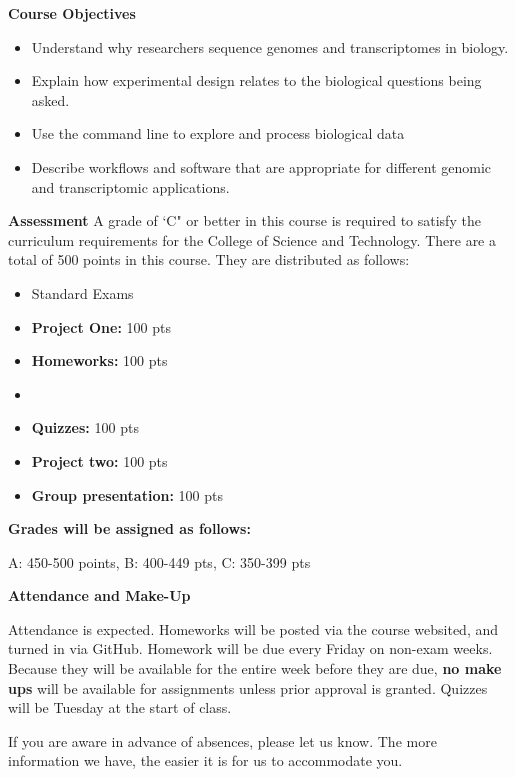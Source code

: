 \documentclass[12pt]{article}
\let\oldtextbf\textbf
\renewcommand{\textbf}[1]{\textcolor{coolblack}{\oldtextbf{#1}}}
\begin{document}
\bigskip
\begin{flushleft}

\textbf{Course Objectives}

\begin{itemize}

\item Understand why researchers sequence genomes and transcriptomes in biology.
\item Explain how experimental design relates to the biological questions being asked.
\item Use the command line to explore and process biological data
\item Describe workflows and software that are appropriate for different genomic and transcriptomic applications.

\end{itemize}
\end{flushleft}

\bigskip

\begin{flushleft}
\textbf{Assessment}
A grade of `C" or better in this course is required to satisfy the curriculum requirements for the College of Science and Technology. There are a total of 500 points in this course. They are distributed as follows:

\begin{itemize}
\item Standard Exams
\item \textbf{Project One:} 100 pts
\item \textbf{Homeworks:} 100 pts
\item \item \textbf{Quizzes:} 100 pts
\item \textbf{Project two:} 100 pts
\item \textbf{Group presentation:} 100 pts
\end{itemize}	

\bigskip

\textbf{Grades will be assigned as follows:}

A: 450-500 points, B: 400-449 pts, C: 350-399 pts
\end{flushleft}

\bigskip

\begin{flushleft}
\textbf{Attendance and Make-Up}
\end{flushleft}

 Attendance is expected. Homeworks will be posted via the course websited, and turned in via GitHub. Homework will be due every Friday on non-exam weeks. Because they will be available for the entire week before they are due, \textbf{no make ups} will be available for assignments unless prior approval is granted. Quizzes will be Tuesday at the start of class. \par
 If you are aware in advance of absences, please let us know. The more information we have, the easier it is for us to accommodate you. \par
\end{document}
